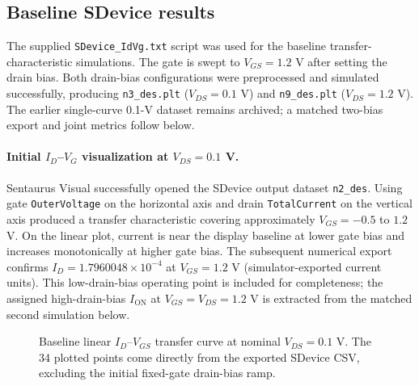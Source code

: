 \documentclass[11pt,a4paper]{article}
\begin{document}
\subsection{Baseline SDevice results}
The supplied \texttt{SDevice\_IdVg.txt} script was used for the baseline transfer-characteristic simulations. The gate is swept to $V_{GS}=1.2$ V after setting the drain bias. Both drain-bias configurations were preprocessed and simulated successfully, producing \texttt{n3\_des.plt} ($V_{DS}=0.1$ V) and \texttt{n9\_des.plt} ($V_{DS}=1.2$ V). The earlier single-curve 0.1-V dataset remains archived; a matched two-bias export and joint metrics follow below.

\paragraph{Initial $I_D$--$V_G$ visualization at $V_{DS}=0.1$ V.}
Sentaurus Visual successfully opened the SDevice output dataset \texttt{n2\_des}. Using gate \texttt{OuterVoltage} on the horizontal axis and drain \texttt{TotalCurrent} on the vertical axis produced a transfer characteristic covering approximately $V_{GS}=-0.5$ to $1.2$ V. On the linear plot, current is near the display baseline at lower gate bias and increases monotonically at higher gate bias. The subsequent numerical export confirms
$I_D=1.7960048\times10^{-4}$ at $V_{GS}=1.2$ V
(simulator-exported current units). This low-drain-bias
operating point is included for completeness; the assigned
high-drain-bias $I_{\mathrm{ON}}$ at $V_{GS}=V_{DS}=1.2$ V
is extracted from the matched second simulation below.
\begin{figure}[H]
\centering
{}
\caption{Baseline linear $I_D$--$V_{GS}$ transfer curve at nominal $V_{DS}=0.1$ V. The 34 plotted points come directly from the exported SDevice CSV, excluding the initial fixed-gate drain-bias ramp.}
\label{fig:idvg_vd01_linear}
\end{figure}
\end{document}
